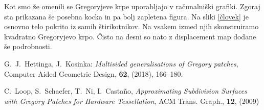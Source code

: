 \documentclass[a4paper,regno]{article}
\begin{document}
Kot smo že omenili se Gregoryjeve krpe uporabljajo v računalniški grafiki.
Zgoraj sta prikazana še posebna kocka in pa bolj zapletena figura.
Na sliki \ref{človek} je osnovno telo pokrito iz samih štirikotnikov. Na vsakem izmed njih skonstruiramo kvadratno Gregoryjevo krpo. Čisto na desni so nato z displacement map dodane še podrobnosti.

\begin{thebibliography}{99}

	
	G.~J.~Hettinga, J.~Kosinka: \emph{Multisided generalisations of Gregory patches},
	Computer Aided Geometric Design, \textbf{62}, (2018), 166–180.
	
	C.~Loop, S.~Schaefer, T.~Ni, I.~Castaño, \emph{Approximating Subdivision Surfaces with Gregory Patches for Hardware Tessellation}, ACM Trans. Graph., \textbf{12}, (2009)
	
\end{thebibliography}
\end{document}
